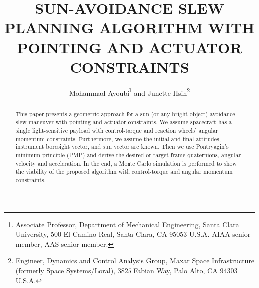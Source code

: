 \documentclass[letterpaper, paper,12pt]{AAS}		%
\begin{document}
	
	\title{SUN-AVOIDANCE SLEW PLANNING ALGORITHM WITH POINTING AND ACTUATOR CONSTRAINTS}
	
	\author{
		Mohammad Ayoubi\thanks{Associate Professor, Department of Mechanical Engineering, Santa Clara University, 500 El Camino Real, Santa Clara, CA 95053 U.S.A. AIAA senior member, AAS senior member.} and Junette Hsin\thanks{Engineer, Dynamics and Control Analysis Group, Maxar Space Infrastructure (formerly Space Systems/Loral), 3825 Fabian Way, Palo Alto, CA 94303 U.S.A.}
	}
	
	\maketitle{} 			
	\begin{abstract}
This paper presents a geometric approach for a sun (or any bright object) avoidance slew maneuver with pointing and actuator constraints. We assume spacecraft has a single light-sensitive payload with control-torque and reaction wheels' angular momentum constraints. Furthermore, we assume the initial and final attitudes, instrument boresight vector, and sun vector are known. Then we use Pontryagin's minimum principle (PMP) and derive the desired or target-frame quaternions, angular velocity and acceleration. In the end, a Monte Carlo simulation is performed to show the viability of the proposed algorithm with control-torque and angular momentum constraints. 
	\end{abstract}
	
\end{document}
